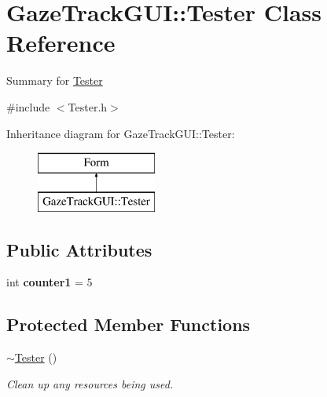 \hypertarget{class_gaze_track_g_u_i_1_1_tester}{}\section{Gaze\+Track\+G\+UI\+:\+:Tester Class Reference}
\label{class_gaze_track_g_u_i_1_1_tester}


Summary for \mbox{\hyperlink{class_gaze_track_g_u_i_1_1_tester}{Tester}}  




{\ttfamily \#include $<$Tester.\+h$>$}

Inheritance diagram for Gaze\+Track\+G\+UI\+:\+:Tester\+:\begin{figure}[H]
\begin{center}
\leavevmode
\includegraphics[height=2.000000cm]{class_gaze_track_g_u_i_1_1_tester}
\end{center}
\end{figure}
\subsection*{Public Attributes}
\begin{DoxyCompactItemize}
\item 
\mbox{\label{class_gaze_track_g_u_i_1_1_tester_a6d7e79e27e3dd658636b5e9c63b549d2}} 
int {\bfseries counter1} = 5
\end{DoxyCompactItemize}
\subsection*{Protected Member Functions}
\begin{DoxyCompactItemize}
\item 
\mbox{\hyperlink{class_gaze_track_g_u_i_1_1_tester_ac42ed2ea3e4c5b2fbdafe6d11d26cb49}{$\sim$\+Tester}} ()
\begin{DoxyCompactList}\small\item\em Clean up any resources being used. \end{DoxyCompactList}\end{DoxyCompactItemize}
